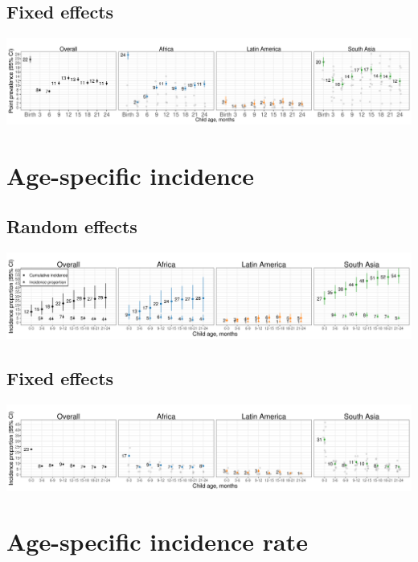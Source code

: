 \documentclass[
  9pt,
]{book}
\begin{document}
\hypertarget{fixed-effects-1}{%
\subsection{Fixed effects}\label{fixed-effects-1}}

\includegraphics[width=58.33in]{figures/wasting/FE/fig-wast-2-prev-overall_region--allage-primary_FE}

\hypertarget{age-specific-incidence}{%
\section{Age-specific incidence}\label{age-specific-incidence}}

\hypertarget{random-effects-1}{%
\subsection{Random effects}\label{random-effects-1}}

\includegraphics[width=58.33in]{figures/wasting/fig-wast-2-cuminc-overall_region--allage-primary}

\hypertarget{fixed-effects-2}{%
\subsection{Fixed effects}\label{fixed-effects-2}}

\includegraphics[width=58.33in]{figures/wasting/FE/fig-wast-2-cuminc-overall_region--allage-primary_FE}

\hypertarget{age-specific-incidence-rate}{%
\section{Age-specific incidence rate}\label{age-specific-incidence-rate}}
\end{document}
